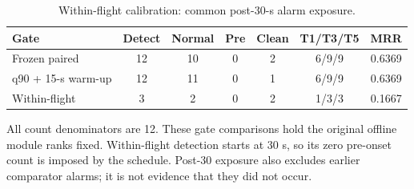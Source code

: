 \begin{table}[htbp]
\centering\footnotesize
\caption{Within-flight calibration: common post-30-s alarm exposure.}
\label{tab:s_p14_post30}
\renewcommand{\arraystretch}{1.15}
\setlength{\tabcolsep}{4pt}
\begin{tabular}{lcccccc}
\toprule
Gate & Detect & Normal & Pre & Clean & T1/T3/T5 & MRR\\
\midrule
Frozen paired & 12 & 10 & 0 & 2 & 6/9/9 & 0.6369\\
q90 + 15-s warm-up & 12 & 11 & 0 & 1 & 6/9/9 & 0.6369\\
Within-flight & 3 & 2 & 0 & 2 & 1/3/3 & 0.1667\\
\bottomrule
\end{tabular}
\par\smallskip\parbox{0.98\linewidth}{\scriptsize All count denominators are 12. These gate comparisons hold the original offline module ranks fixed. Within-flight detection starts at 30 s, so its zero pre-onset count is imposed by the schedule. Post-30 exposure also excludes earlier comparator alarms; it is not evidence that they did not occur.}
\end{table}
